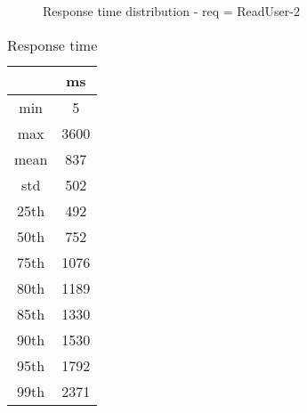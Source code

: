 \begin{minipage}{0.75\linewidth}
\begin{figure}[h]
\begin{adjustbox}{max width=1.0\linewidth, keepaspectratio}
  \end{adjustbox}
  \caption{Response time distribution - req = ReadUser-2}
\end{figure}
\end{minipage}\hfill\begin{minipage}{0.18\linewidth}
\begin{table}[h]
\begin{tabular}{|cc|}
\hline
\textbf{} & \textbf{ms}\\ \hline
 \Xhline{0.005\arrayrulewidth}
min & 5\\
 \Xhline{0.005\arrayrulewidth}
max & 3600\\
 \Xhline{0.005\arrayrulewidth}
mean & 837\\
 \Xhline{0.005\arrayrulewidth}
std & 502\\
\hline
\hline
 \Xhline{0.005\arrayrulewidth}
25th & 492\\
 \Xhline{0.005\arrayrulewidth}
50th & 752\\
 \Xhline{0.005\arrayrulewidth}
75th & 1076\\
 \Xhline{0.005\arrayrulewidth}
80th & 1189\\
 \Xhline{0.005\arrayrulewidth}
85th & 1330\\
 \Xhline{0.005\arrayrulewidth}
90th & 1530\\
 \Xhline{0.005\arrayrulewidth}
95th & 1792\\
 \Xhline{0.005\arrayrulewidth}
99th & 2371\\
\hline
\end{tabular}
\caption{Response time}
\end{table}
\end{minipage}\hfill